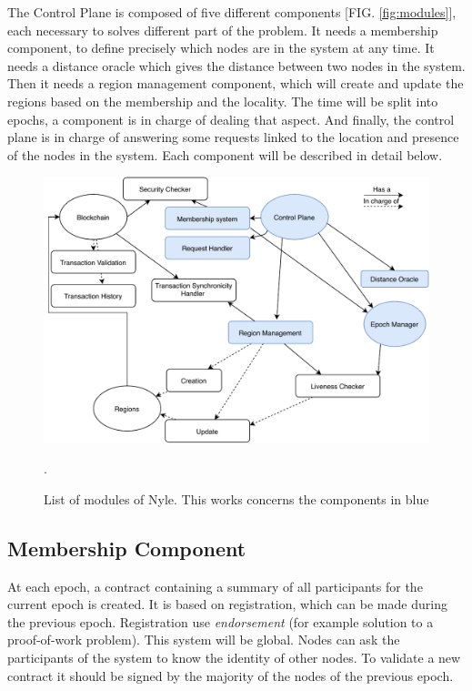 \documentclass[a4paper,11pt,oneside]{report}
\begin{document}
The Control Plane is composed of five different components [FIG.
\autoref{fig:modules}], each necessary to solves different part of the problem. It
needs a membership component, to define precisely which nodes are in the system
at any time. It needs a distance oracle which gives the distance between two
nodes in the system. Then it needs a region management component, which will
create and update the regions based on the membership and the locality. The time will be
split into epochs, a component is in charge of dealing that aspect. And
finally, the control plane is in charge of answering some requests linked to
the location and presence of the nodes in the system. Each component will be described in
detail below. 

\begin{figure}[!h]
\centering
\includegraphics[width=400pt]{figures/Nyle_components}
\caption{List of modules of Nyle. This works concerns the components in blue}.
\label{fig:modules}
\end{figure}

\subsection{Membership Component}

At each epoch, a contract containing a summary of all participants for the current epoch is
created. It is based on registration, which can be made during the previous epoch. Registration use \textit{endorsement} (for example solution to a proof-of-work
problem). This system will be global. Nodes can ask the participants of the
system to know the identity of other nodes. To validate a new contract it
should be signed by the majority of the nodes of the previous epoch.
\end{document}
